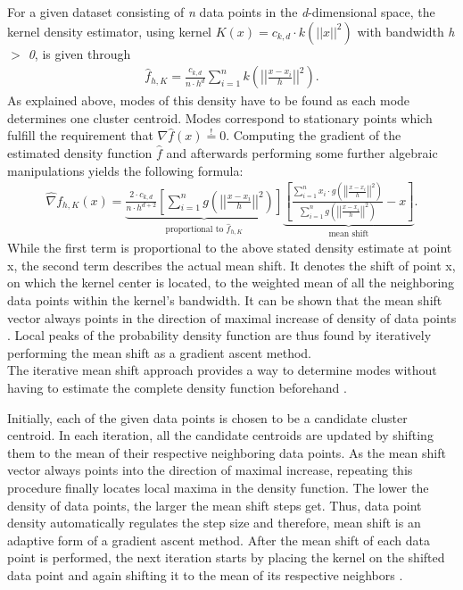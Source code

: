 For a given dataset consisting of \textit{n} data points in the \textit{d}-dimensional space, the kernel density estimator, using kernel $K(x)=c_{k, d} \cdot k \left( ||x||^{2} \right)$ with bandwidth \textit{h $>$ 0}, is given through\\
\begin{align*}
	\hat{f}_{h, K} = \frac{c_{k, d}}{n \cdot h^{d}} \sum_{i=1}^{n} k \left( \left|\left|\frac{x - x_{i}}{h} \right|\right|^{2}\right).
\end{align*}
As explained above, modes of this density have to be found as each mode determines one cluster centroid. Modes correspond to stationary points which fulfill the requirement that $\nabla \hat{f}(x) \overset{!}{=} 0$. Computing the gradient of the estimated density function $\hat{f}$ and afterwards performing some further algebraic manipulations yields the following formula:
\begin{align*}
	\hat{\nabla} f_{h,K}(x) = \underbrace{\frac{2 \cdot c_{k, d}}{n \cdot h^{d+2}} \left[ \sum_{i=1}^{n} g \left( \left| \left| \frac{x-x_{i}}{h} \right| \right| ^{2} \right) \right]}_{\text{proportional to $\hat{f}_{h, K}$}}\underbrace{ \left[ \frac{\sum_{i=1}^{n} x_{i} \cdot g \left( \left| \left| \frac{x-x_{i}}{h} \right| \right| ^{2} \right)}{\sum_{i=1}^{n} g \left( \left| \left| \frac{x-x_{i}}{h} \right| \right| ^{2} \right)} - x \right]}_{\text{mean shift}}.
\end{align*}
While the first term is proportional to the above stated density estimate at point x, the second term describes the actual mean shift. It denotes the shift of point x, on which the kernel center is located, to the weighted mean of all the neighboring data points within the kernel's bandwidth. It can be shown that the mean shift vector always points in the direction of maximal increase of density of data points \cite{comaniciu2002MeanShift}. 
Local peaks of the probability density function are thus found by iteratively performing the mean shift as a gradient ascent method.\\
The iterative mean shift approach provides a way to determine modes without having to estimate the complete density function beforehand \cite{comaniciu2002MeanShift}.

Initially, each of the given data points is chosen to be a candidate cluster centroid. In each iteration, all the candidate centroids are updated by shifting them to the mean of their respective neighboring data points. As the mean shift vector always points into the direction of maximal increase, repeating this procedure finally locates local maxima in the density function.
The lower the density of data points, the larger the mean shift steps get. Thus, data point density automatically regulates the step size and therefore, mean shift is an adaptive form of a gradient ascent method. 
After the mean shift of each data point is performed, the next iteration starts by placing the kernel on the shifted data point and again shifting it to the mean of its respective neighbors \cite{400568}. 


